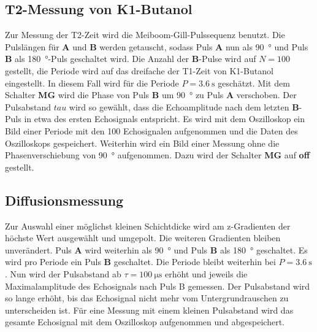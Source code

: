 \subsection{T2-Messung von K1-Butanol}
Zur Messung der T2-Zeit wird die Meiboom-Gill-Pulssequenz benutzt.
Die Pulslängen für \textbf{A} und \textbf{B} werden getauscht, sodass Puls \textbf{A} nun als \SI{90}{\degree} und Puls \textbf{B} als \SI{180}{\degree}-Puls geschaltet wird.
Die Anzahl der \textbf{B}-Pulse wird auf $N=100$ gestellt, die Periode wird auf das dreifache der T1-Zeit von K1-Butanol eingestellt.
In diesem Fall wird für die Periode $P = \SI{3.6}{\second}$ geschätzt.
Mit dem Schalter \textbf{MG} wird die Phase von Puls \textbf{B} um \SI{90}{\degree} zu Puls \textbf{A} verschoben.
Der Pulsabstand $tau$ wird so gewählt, dass die Echoamplitude nach dem letzten \textbf{B}-Puls in etwa  des ersten Echosignals entspricht.
Es wird mit dem Oszilloskop ein Bild einer Periode mit den 100 Echosignalen aufgenommen und die Daten des Oszilloskops gespeichert.
Weiterhin wird ein Bild einer Messung ohne die Phasenverschiebung von \SI{90}{\degree} aufgenommen. Dazu wird der Schalter \textbf{MG} auf \textbf{off} gestellt.

\subsection{Diffusionsmessung}
Zur Auswahl einer möglichst kleinen Schichtdicke wird am z-Gradienten der höchste Wert ausgewählt und umgepolt.
Die weiteren Gradienten bleiben unverändert.
Puls \textbf{A} wird weiterhin als \SI{90}{\degree} und Puls \textbf{B} als \SI{180}{\degree} geschaltet.
Es wird pro Periode ein Puls \textbf{B} geschaltet.
Die Periode bleibt weiterhin bei $P = \SI{3.6}{\second}$.
Nun wird der Pulsabstand ab $\tau = \SI{100}{\micro\second}$ erhöht und jeweils die Maximalamplitude des Echosignals nach Puls B gemessen.
Der Pulsabstand wird so lange erhöht, bis das Echosignal nicht mehr vom Untergrundrauschen zu unterscheiden ist.
Für eine Messung mit einem kleinen Pulsabstand wird das gesamte Echosignal mit dem Oszilloskop aufgenommen und abgespeichert.
